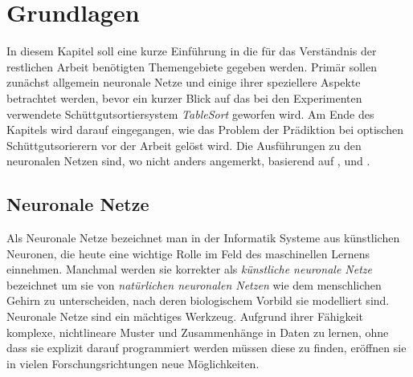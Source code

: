 \chapter{Grundlagen}
\label{cap:basics}



In diesem Kapitel soll eine kurze Einführung in die für das Verständnis der restlichen Arbeit benötigten Themengebiete gegeben werden.
Primär sollen zunächst allgemein neuronale Netze und einige ihrer speziellere Aspekte betrachtet werden, 
bevor ein kurzer Blick auf das bei den Experimenten verwendete Schüttgutsortiersystem \textit{TableSort} geworfen wird. 
Am Ende des Kapitels wird darauf eingegangen, wie das Problem der Prädiktion bei optischen Schüttgutsorierern vor der Arbeit gelöst wird.
Die Ausführungen zu den neuronalen Netzen sind, wo nicht anders angemerkt, basierend auf \cite{Goodfellow-et-al-2016}, \cite{Murphy:2012:MLP:2380985} und \cite{nielsen2015neural}.

% 

\section{Neuronale Netze}

Als Neuronale Netze  %
bezeichnet man in der Informatik Systeme aus künstlichen Neuronen, die heute eine wichtige Rolle im Feld des maschinellen Lernens einnehmen.
Manchmal werden sie korrekter als \textit{künstliche neuronale Netze} bezeichnet um sie von \textit{natürlichen neuronalen Netzen} 
wie dem menschlichen Gehirn zu unterscheiden, nach deren biologischem Vorbild sie modelliert sind.
Neuronale Netze sind ein mächtiges Werkzeug. 
Aufgrund ihrer Fähigkeit komplexe, nichtlineare Muster und Zusammenhänge in Daten zu lernen, 
ohne dass sie explizit darauf programmiert werden müssen diese zu finden,
eröffnen sie in vielen Forschungsrichtungen neue Möglichkeiten.


